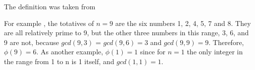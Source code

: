 \begin{appendices}
\begin{definition}
  The definition was taken from \cite{wiki:eulerfunction}
  \label{def:eulerfuction}
\end{definition}

\begin{example}
  For example \cite{wiki:eulerfunction}, the totatives of $n = 9$ are
  the six numbers 1, 2, 4, 5, 
  7 and 8. They are all relatively prime to 9, but the other three
  numbers in this range, 3, 6, and 9 are not, because
  $gcd\left(9, 3\right)$ =
  $gcd\left(9, 6\right) = 3$ and $gcd\left(9, 9\right) = 9$.
  Therefore, $\phi\left(9\right) = 6$. As another
  example, $\phi\left(1\right) = 1$ since for $n = 1$ the only integer in the range from
  1 to n is 1 itself, and $gcd\left(1, 1\right) = 1$. 
\end{example}

\end{appendices}

